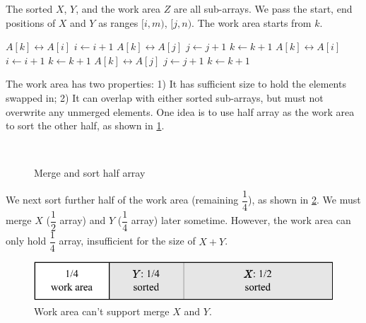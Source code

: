 \documentclass[b5paper]{article}
\begin{document}
The sorted $X$, $Y$, and the work area $Z$ are all sub-arrays. We pass the start, end positions of $X$ and $Y$ as ranges $[i, m)$, $[j, n)$. The work area starts from $k$.

\begin{algorithmic}[1]
\Procedure{Merge}{$A, [i, m), [j, n), k$}
      \State {} $A[k] \leftrightarrow A[i]$
      \State $i \gets i + 1$
    \Else
      \State {} $A[k] \leftrightarrow A[j]$
      \State $j \gets j + 1$
    \EndIf
    \State $k \gets k + 1$
  \EndWhile
    \State {} $A[k] \leftrightarrow A[i]$
    \State $i \gets i + 1$
    \State $k \gets k + 1$
  \EndWhile
    \State {} $A[k] \leftrightarrow A[j]$
    \State $j \gets j + 1$
    \State $k \gets k + 1$
  \EndWhile
\EndProcedure
\end{algorithmic}

The work area has two properties: 1) It has sufficient size to hold the elements swapped in; 2) It can overlap with either sorted sub-arrays, but must not overwrite any unmerged elements. One idea is to use half array as the work area to sort the other half, as shown in \cref{fig:merge-in-place-start}.

\begin{figure}[htbp]
 \centering
       \\
 \caption{Merge and sort half array}
 \label{fig:merge-in-place-start}
\end{figure}

We next sort further half of the work area (remaining $\dfrac{1}{4}$), as shown in \cref{fig:merge-in-place-quater}. We must merge $X$ ($\dfrac{1}{2}$ array) and $Y$ ($\dfrac{1}{4}$ array) later sometime. However, the work area can only hold $\dfrac{1}{4}$ array, insufficient for the size of $X + Y$.

\begin{figure}[htbp]
 \centering
 \includegraphics[scale=0.8]{img/workarea-1}
 \caption{Work area can't support merge $X$ and $Y$.}
 \label{fig:merge-in-place-quater}
\end{figure}
\end{document}
